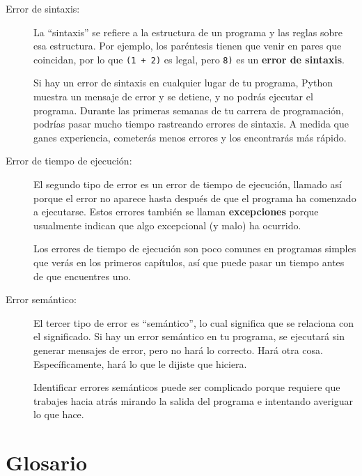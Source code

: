 \documentclass[10pt]{book}
\begin{document}
\begin{description}

\item[Error de sintaxis:] La ``sintaxis'' se refiere a la estructura de un programa
  y las reglas sobre esa estructura.  Por ejemplo, los paréntesis tienen
  que venir en pares que coincidan, por lo que {\tt (1 + 2)} es legal, pero {\tt 8)}
  es un {\bf error de sintaxis}.   

Si hay un error de sintaxis
en cualquier lugar de tu programa, Python muestra un mensaje de error y se detiene,
y no podrás ejecutar el programa.  Durante las primeras
semanas de tu carrera de programación, podrías pasar mucho
tiempo rastreando errores de sintaxis.  A medida que ganes experiencia,
cometerás menos errores y los encontrarás más rápido.


\item[Error de tiempo de ejecución:] El segundo tipo de error es un error de tiempo de ejecución,
  llamado así porque el error no aparece hasta después de que el programa ha
  comenzado a ejecutarse.  Estos errores también se llaman {\bf excepciones}
  porque usualmente indican que algo excepcional (y malo)
  ha ocurrido.   
    

Los errores de tiempo de ejecución son poco comunes en programas simples que verás en los
primeros capítulos, así que puede pasar un tiempo antes de que encuentres uno.


\item[Error semántico:] El tercer tipo de error es ``semántico'', lo cual
  significa que se relaciona con el significado.  Si hay un error semántico en tu
  programa, se ejecutará sin generar mensajes de error, pero
  no hará lo correcto.  Hará otra cosa.  Específicamente,
  hará lo que le dijiste que hiciera.  
   

Identificar errores semánticos puede ser complicado porque requiere que trabajes
hacia atrás mirando la salida del programa e intentando averiguar
lo que hace.

\end{description}


\section{Glosario}
\end{document}
